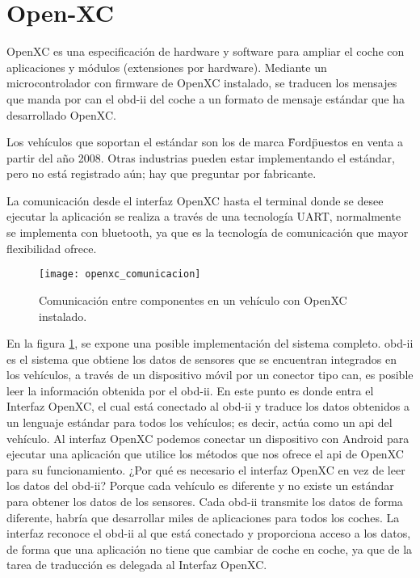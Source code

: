 \section{Open-XC}\label{apendice:open-xc}
OpenXC es una especificación de hardware y software para ampliar el coche con
aplicaciones y módulos (extensiones por hardware). Mediante un microcontrolador
con firmware de OpenXC instalado, se traducen los mensajes que manda por
\gls{can} el \Gls{obd-ii} del coche a un formato de mensaje estándar que ha
desarrollado OpenXC.

Los vehículos que soportan el estándar son los de marca \"Ford\" puestos
en venta a partir del año 2008. Otras industrias pueden estar implementando el
estándar, pero no está registrado aún; hay que preguntar por fabricante.

La comunicación desde el interfaz OpenXC hasta el terminal donde se desee
ejecutar la aplicación se realiza a través de una tecnología \gls{UART},
normalmente se implementa con bluetooth, ya que es la tecnología de comunicación
que mayor flexibilidad ofrece.

\begin{figure}[H]
	\begin{center}
		\texttt{[image: openxc\_comunicacion]}
		\caption{Comunicación entre componentes en un vehículo con OpenXC instalado.}
		\label{fig:openxc_comunicacion}
	\end{center}
\end{figure}


En la figura \ref{fig:openxc_comunicacion}, se expone una posible
implementación del sistema completo. \Gls{obd-ii} es el sistema que obtiene los
datos de sensores que se encuentran integrados en los vehículos, a través de un
dispositivo móvil por un conector tipo \gls{can}, es posible leer la información
obtenida por el \Gls{obd-ii}. En este punto es donde entra el Interfaz OpenXC,
el cual está conectado al \Gls{obd-ii} y traduce los datos obtenidos a un
lenguaje estándar para todos los vehículos; es decir, actúa como un \gls{api}
del vehículo. Al interfaz OpenXC podemos conectar un dispositivo con Android
para ejecutar una aplicación que utilice los métodos que nos ofrece el \gls{api}
de OpenXC para su funcionamiento. ¿Por qué es necesario el interfaz OpenXC en
vez de leer los datos del \Gls{obd-ii}? Porque cada vehículo es diferente y no
existe un estándar para obtener los datos de los sensores. Cada \Gls{obd-ii}
transmite los datos de forma diferente, habría que desarrollar miles de
aplicaciones para todos los coches. La interfaz reconoce el \Gls{obd-ii} al que
está conectado y proporciona acceso a los datos, de forma que una aplicación no
tiene que cambiar de coche en coche, ya que de la tarea de traducción es
delegada al Interfaz OpenXC.

